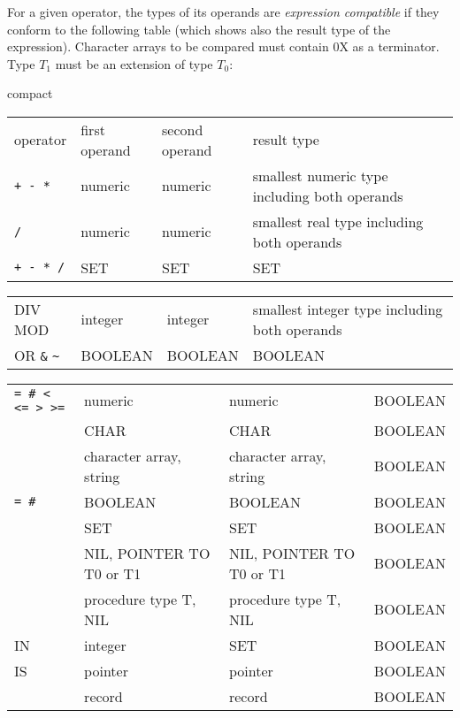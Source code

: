 For a given operator, the types of its operands are {\em expression compatible}
if they conform to the following table (which shows also the result
type of the expression). Character arrays to be compared
must contain 0X as a terminator. Type $T_1$ must be an extension
of type $T_0$:
\begin{flushleft}
\if compact \footnotesize \else \small \fi
\newlength{\Operator}\settowidth{\Operator}{\verb|= = < <= > >=|}
\newlength{\Operand}
\newlength{\ResType}
\ifcompact
        \Operand=2.4cm
        \ResType=2.7cm
\else
        \Operand=2.7cm
        \ResType=3.7cm
\fi
\begin{tabular}{p{\Operator}p{\Operand}p{\Operand}p{\ResType}}
operator & first operand   & second operand     & result type \\
\verb|+ - *| & numeric         &  numeric
                               & smallest numeric type including both operands \\
\verb|/|     & numeric         & numeric
                               & smallest real type including both operands \\
\verb|+ - * /|  & SET           & SET                &  SET \\
\end{tabular}
\begin{tabular}{p{\Operator}p{\Operand}p{\Operand}p{\ResType}}
DIV MOD  & integer         & integer
                                & smallest integer type including both operands \\
OR \verb|&| \verb|~| & BOOLEAN & BOOLEAN        & BOOLEAN \\
\end{tabular}
\begin{tabular}{p{\Operator}p{\Operand}p{\Operand}p{\ResType}}
\verb|= # < <= > >=|
              & numeric         &   numeric     & BOOLEAN \\
              & CHAR            &  CHAR         & BOOLEAN \\
              & character array, string
              & character array, string         & BOOLEAN \\
\verb|= #|    & BOOLEAN         & BOOLEAN       & BOOLEAN \\
              & SET             &     SET       & BOOLEAN \\
              & NIL, POINTER TO T0 or T1
              & NIL, POINTER TO T0 or T1        & BOOLEAN \\
              & procedure type T, NIL
              & procedure type T, NIL           & BOOLEAN \\
IN            & integer         &     SET       & BOOLEAN \\
IS            & pointer         &     pointer   & BOOLEAN \\
              & record          &     record    & BOOLEAN \\
\end{tabular}
\end{flushleft}

